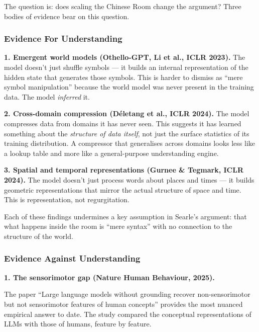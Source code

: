 \documentclass[11pt, a4paper]{article}
\begin{document}
The question is: does scaling the Chinese Room change the argument? Three
bodies of evidence bear on this question.

\subsubsection{Evidence For Understanding}

\textbf{1. Emergent world models (Othello-GPT, Li et al., ICLR 2023).}
The model doesn't just shuffle symbols --- it builds an internal
representation of the hidden state that generates those symbols. This is
harder to dismiss as ``mere symbol manipulation'' because the world model
was never present in the training data. The model \emph{inferred} it.

\textbf{2. Cross-domain compression (D\'{e}letang et al., ICLR 2024).}
The model compresses data from domains it has never seen. This suggests
it has learned something about the \emph{structure of data itself}, not
just the surface statistics of its training distribution. A compressor
that generalises across domains looks less like a lookup table and more
like a general-purpose understanding engine.

\textbf{3. Spatial and temporal representations (Gurnee \& Tegmark, ICLR
2024).} The model doesn't just process words about places and times ---
it builds geometric representations that mirror the actual structure of
space and time. This is representation, not regurgitation.

Each of these findings undermines a key assumption in Searle's argument:
that what happens inside the room is ``mere syntax'' with no connection
to the structure of the world.


\subsubsection{Evidence Against Understanding}

\textbf{1. The sensorimotor gap (Nature Human Behaviour, 2025).}

The paper ``Large language models without grounding recover non-sensorimotor
but not sensorimotor features of human concepts'' provides the most
nuanced empirical answer to date. The study compared the conceptual
representations of LLMs with those of humans, feature by feature.
\end{document}
